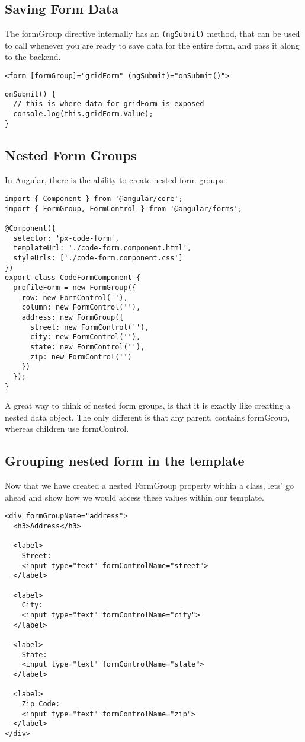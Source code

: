 \subsection{Saving Form Data}
The formGroup directive internally has an \lstinline{(ngSubmit)} method, that 
can be used to call whenever you are ready to save data for the entire form, 
and pass it along to the backend. 
\begin{lstlisting}[caption=code-form.component.html]
<form [formGroup]="gridForm" (ngSubmit)="onSubmit()">
\end{lstlisting}

\begin{lstlisting}[caption=grid-form.component.ts]
onSubmit() {
  // this is where data for gridForm is exposed
  console.log(this.gridForm.Value);
}
\end{lstlisting}

\subsection{ Nested Form Groups }
In Angular, there is the ability to create nested form groups: 

\begin{lstlisting}[caption=px-code-form.component.ts]
import { Component } from '@angular/core';
import { FormGroup, FormControl } from '@angular/forms';

@Component({
  selector: 'px-code-form',
  templateUrl: './code-form.component.html',
  styleUrls: ['./code-form.component.css']
})
export class CodeFormComponent {
  profileForm = new FormGroup({
    row: new FormControl(''),
    column: new FormControl(''),
    address: new FormGroup({
      street: new FormControl(''),
      city: new FormControl(''),
      state: new FormControl(''),
      zip: new FormControl('')
    })
  });
}
\end{lstlisting}

A great way to think of nested form groups, is that it is exactly like creating 
a nested data object. The only different is that any parent, contains formGroup, 
whereas children use formControl. 

\subsection{ Grouping nested form in the template } 
Now that we have created a nested FormGroup property within a class, lets' go
ahead and show how we would access these values within our template.
\begin{lstlisting}
<div formGroupName="address">
  <h3>Address</h3>

  <label>
    Street:
    <input type="text" formControlName="street">
  </label>

  <label>
    City:
    <input type="text" formControlName="city">
  </label>
  
  <label>
    State:
    <input type="text" formControlName="state">
  </label>

  <label>
    Zip Code:
    <input type="text" formControlName="zip">
  </label>
</div>
\end{lstlisting}

